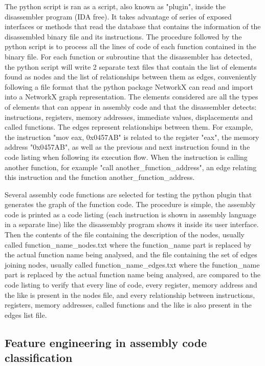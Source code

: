 \begin{appendices}
The python script is ran as a script, also known as "plugin", inside the disassembler program (IDA free). It takes advantage of series of exposed interfaces or methods that read the database that contains the information of the disassembled binary file and its instructions. The procedure followed by the python script is to process all the lines of code of each function contained in the binary file. For each function or subroutine that the disassembler has detected, the python script will write 2 separate text files that contain the list of elements found as nodes and the list of relationships between them as edges, conveniently following a file format that the python package NetworkX can read and import into a NetworkX graph representation. 
The elements considered are all the types of elements that can appear in assembly code and that the disassembler detects: instructions, registers, memory addresses, immediate values, displacements and called functions. The edges represent relationships between them. For example, the instruction "mov eax, 0x0457AB" is related to the register "eax", the memory address "0x0457AB", as well as the previous and next instruction found in the code listing when following its execution flow. When the instruction is calling another function, for example "call another\_function\_address", an edge relating this instruction and the function another\_function\_address. 


Several assembly code functions are selected for testing the python plugin that generates the graph of the function code. The procedure is simple, the assembly code is printed as a code listing (each instruction is shown in assembly language in a separate line) like the disassembly program shows it inside its user interface. Then the contents of the file containing the description of the nodes, usually called function\_name\_nodes.txt where the function\_name part is replaced by the actual function name being analysed, and the file containing the set of edges joining nodes, usually called function\_name\_edges.txt where the function\_name part is replaced by the actual function name being analysed, are compared to the code listing to verify that every line of code, every register, memory address and the like is present in the nodes file, and every relationship between instructions, registers, memory addresses, called functions and the like is also present in the edges list file.

\subsection{Feature engineering in assembly code classification}


\end{appendices}
